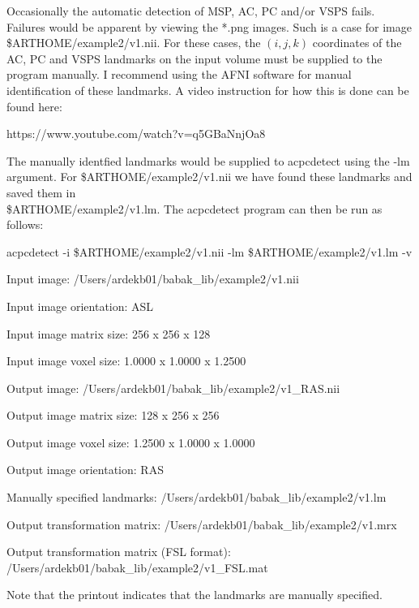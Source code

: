 \documentclass[11pt]{article}
\begin{document}
 Occasionally the automatic detection of MSP, AC, PC and/or VSPS
fails. Failures would be apparent by viewing the *.png images.
Such is a case for image \$ARTHOME/example2/v1.nii.  For these cases, the $(i,j,k)$ coordinates
of the AC, PC and VSPS landmarks on the input volume must be supplied to the program manually.  I recommend
using the AFNI software for manual identification of these landmarks. A video instruction for how this is
done can be found here: 

https://www.youtube.com/watch?v=q5GBaNnjOa8 

\noindent The manually identfied landmarks would be supplied to acpcdetect using the -lm argument.  For 
\$ARTHOME/example2/v1.nii we have found these landmarks and saved them in \\
\$ARTHOME/example2/v1.lm.  The acpcdetect program can then be run as follows:

acpcdetect -i \$ARTHOME/example2/v1.nii -lm \$ARTHOME/example2/v1.lm -v


Input image: /Users/ardekb01/babak\_lib/example2/v1.nii

Input image orientation: ASL

Input image matrix size: 256 x 256 x 128

Input image voxel size: 1.0000 x 1.0000 x 1.2500

Output image: /Users/ardekb01/babak\_lib/example2/v1\_RAS.nii

Output image matrix size: 128 x 256 x 256

Output image voxel size: 1.2500 x 1.0000 x 1.0000

Output image orientation: RAS

Manually specified landmarks: /Users/ardekb01/babak\_lib/example2/v1.lm

Output transformation matrix: /Users/ardekb01/babak\_lib/example2/v1.mrx

Output transformation matrix (FSL format): /Users/ardekb01/babak\_lib/example2/v1\_FSL.mat 

\noindent Note that the printout indicates that the landmarks are manually specified.

\end{document}
